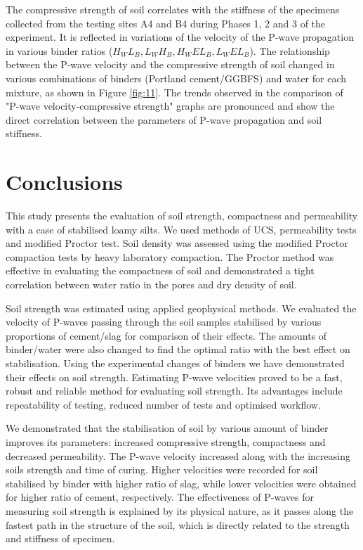 \documentclass{amestyle}
\begin{document}
The compressive strength of soil correlates with the stiffness of the specimens collected from the testing sites A4 and B4 during Phases 1, 2 and 3 of the experiment. It is reflected in variations of the velocity of the P-wave propagation in various binder ratios ($H_WL_B, L_WH_B, H_WEL_B, L_WEL_B$). The relationship between the P-wave velocity and the compressive strength of soil changed in various combinations of binders (Portland cement/GGBFS) and water for each mixture, as shown in Figure \ref{fig:11}. The trends observed in the comparison of "P-wave velocity-compressive strength" graphs are pronounced and show the direct correlation between the parameters of P-wave propagation and soil stiffness. 

\section{Conclusions}
\label{sec:conclusions}

This study presents the evaluation of soil strength, compactness and permeability with a case of stabilised loamy silts. We used methods of UCS, permeability tests and modified Proctor test. Soil density was assessed using the modified Proctor compaction tests by heavy laboratory compaction. The Proctor method was effective in evaluating the compactness of soil and demonstrated a tight correlation between water ratio in the pores and dry density of soil. 

Soil strength was estimated using applied geophysical methods. We evaluated the velocity of P-waves passing through the soil samples stabilised by various proportions of cement/slag for comparison of their effects. The amounts of binder/water were also changed to find the optimal ratio with the best effect on stabilisation. Using the experimental changes of binders we have demonstrated their effects on soil strength. Estimating P-wave velocities proved to be a fast, robust and reliable method for evaluating soil strength. Its advantages include repeatability of testing, reduced number of tests and optimised workflow. 

We demonstrated that the stabilisation of soil by various amount of binder improves its parameters: increased compressive strength, compactness and decreased permeability. The P-wave velocity increased along with the increasing soils strength and time of curing. Higher velocities were recorded for soil stabilised by binder with higher ratio of slag, while lower velocities were obtained for higher ratio of cement, respectively. The effectiveness of P-waves for measuring soil strength is explained by its physical nature, as it passes along the fastest path in the structure of the soil, which is directly related to the strength and stiffness of specimen. 
\end{document}
